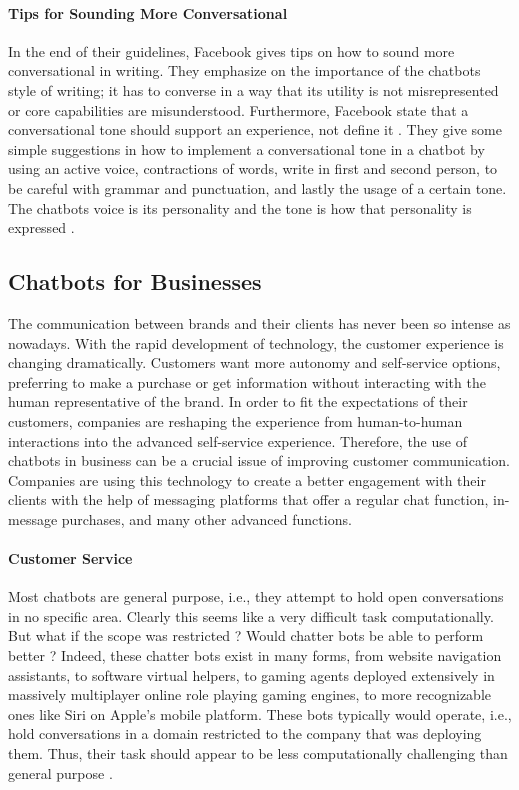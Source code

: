 \paragraph{Tips for Sounding More Conversational}
In the end of their guidelines, Facebook gives tips on how to sound more conversational in writing. They emphasize on the importance of the chatbots style of writing; it has to converse in a way that its utility is not misrepresented or core capabilities are misunderstood. Furthermore, Facebook state that a conversational tone should support an experience, not define it \cite{messenger_guidelines}. They give some simple suggestions in how to implement a conversational tone in a chatbot by using an active voice, contractions of words, write in first and second person, to be careful with grammar and punctuation, and lastly the usage of a certain tone. The chatbots voice is its personality and the tone is how that personality is expressed \cite{messenger_guidelines}.

\subsection{Chatbots for Businesses}
The communication between brands and their clients has never been so intense as nowadays. With the rapid development of technology, the customer experience is changing dramatically. Customers want more autonomy and self-service options, preferring to make a purchase or get information without interacting with the human representative of the brand. In order to fit the expectations of their customers, companies are reshaping the experience from human-to-human interactions into the advanced self-service experience. Therefore, the use of chatbots in business can be a crucial issue of improving customer communication. Companies are using this technology to create a better engagement with their clients with the help of messaging platforms that offer a regular chat function, in-message purchases, and many other advanced functions.

\paragraph{Customer Service}
Most chatbots are general purpose, i.e., they attempt to hold open conversations in no specific area. Clearly this seems like a very difficult task computationally. But what if the scope was restricted ? Would chatter bots be able to perform better ? Indeed, these chatter bots exist in many forms, from website navigation assistants, to software virtual helpers, to gaming agents deployed extensively in massively multiplayer online role playing gaming engines, to more recognizable ones like Siri on Apple’s mobile platform. These bots typically would operate, i.e., hold conversations in a domain restricted to the company that was deploying them. Thus, their task should appear to be less computationally challenging than general purpose \cite{chakrabarti2015}.


